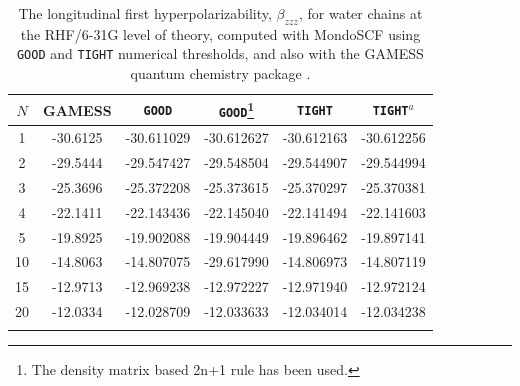 \documentclass[prl,aps,letterpaper,twocolumn,showpacs,twocolumngrid,superbib]{revtex4}
\begin{document}
\begin{table}[h]
  \centering
  \caption{\protect
    The longitudinal first hyperpolarizability, $\beta_{zzz}$,
    for water chains at the RHF/6-31G level of theory, computed with 
    {\sc MondoSCF} using {\tt GOOD} and {\tt TIGHT} numerical thresholds, 
    and also with the {\sc GAMESS} quantum chemistry package \cite{gamess}.
  }\label{tab:Beta_1D_Values}
  \begin{tabular}{cccccc}
    \toprule
    $N$ &\multicolumn{1}{c}{{\sc GAMESS}}
    &\multicolumn{1}{c}{{\tt GOOD}}
    &\multicolumn{1}{c}{{\tt GOOD}\footnote[1]{The density matrix based 2n+1 rule has been used.}}
    &\multicolumn{1}{c}{{\tt TIGHT}}
    &\multicolumn{1}{c}{{\tt TIGHT}$^a$} \\
    \hline
     1 & -30.6125 & -30.611029 & -30.612627 & -30.612163 & -30.612256 \\
     2 & -29.5444 & -29.547427 & -29.548504 & -29.544907 & -29.544994 \\
     3 & -25.3696 & -25.372208 & -25.373615 & -25.370297 & -25.370381 \\
     4 & -22.1411 & -22.143436 & -22.145040 & -22.141494 & -22.141603 \\
     5 & -19.8925 & -19.902088 & -19.904449 & -19.896462 & -19.897141 \\
    10 & -14.8063 & -14.807075 & -29.617990 & -14.806973 & -14.807119 \\
    15 & -12.9713 & -12.969238 & -12.972227 & -12.971940 & -12.972124 \\
    20 & -12.0334 & -12.028709 & -12.033633 & -12.034014 & -12.034238 \\
    \botrule
  \end{tabular}
\end{table}
\end{document}
